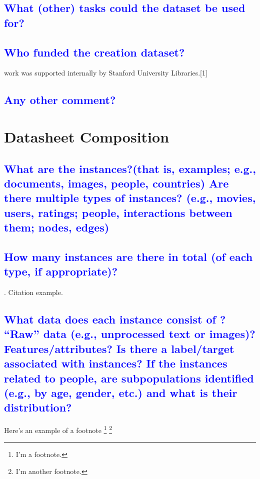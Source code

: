 \documentclass[letterpaper, 10 pt, conference]{ieeeconf}  %
\begin{document}
\textcolor{blue}{\subsection{What (other) tasks could the dataset be used for?}}

\lipsum[1]

\textcolor{blue}{\subsection{Who funded the creation dataset?}}

\This work was supported internally by Stanford University Libraries.[1]

\textcolor{blue}{\subsection{Any other comment?}}

\lipsum[1]

\section{Datasheet Composition}

\textcolor{blue}{\subsection{What are the instances?(that is, examples; e.g., documents, images, people, countries) Are there multiple types
of instances? (e.g., movies, users, ratings; people, interactions between them; nodes, edges)}}
\lipsum[1]

\textcolor{blue}{\subsection{How many instances are there in total (of each type, if appropriate)?}}
\lipsum[1]. Citation example. \cite{latex:companion, latex2e}

\textcolor{blue}{\subsection{What data does each instance consist of ? “Raw”
data (e.g., unprocessed text or images)? Features/attributes? Is there a label/target associated with
instances? If the instances related to people, are subpopulations identified (e.g., by age, gender, etc.) and what is
their distribution?}}
\lipsum[1]
Here's an example of a footnote \footnote{I'm a footnote.} \footnote{I'm another footnote.}
\end{document}
